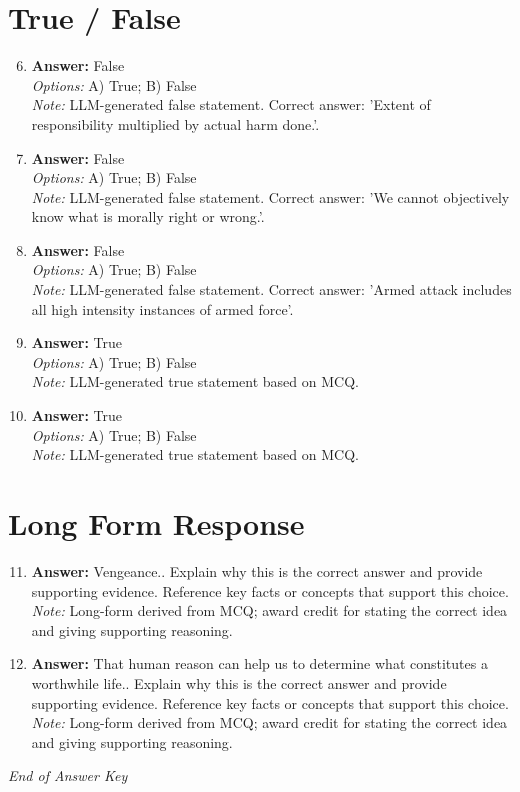 \documentclass[12pt]{article}
\begin{document}
\section*{True / False}
\begin{enumerate}[label=\arabic*.]
\setcounter{enumi}{5}
\item \textbf{Answer:} False
\\ \textit{Options:} A) True; B) False
\\ \textit{Note:} LLM-generated false statement. Correct answer: 'Extent of responsibility multiplied by actual harm done.'.
\item \textbf{Answer:} False
\\ \textit{Options:} A) True; B) False
\\ \textit{Note:} LLM-generated false statement. Correct answer: 'We cannot objectively know what is morally right or wrong.'.
\item \textbf{Answer:} False
\\ \textit{Options:} A) True; B) False
\\ \textit{Note:} LLM-generated false statement. Correct answer: 'Armed attack includes all high intensity instances of armed force'.
\item \textbf{Answer:} True
\\ \textit{Options:} A) True; B) False
\\ \textit{Note:} LLM-generated true statement based on MCQ.
\item \textbf{Answer:} True
\\ \textit{Options:} A) True; B) False
\\ \textit{Note:} LLM-generated true statement based on MCQ.
\end{enumerate}

\section*{Long Form Response}
\begin{enumerate}[label=\arabic*.]
\setcounter{enumi}{10}
\item \textbf{Answer:} Vengeance.. Explain why this is the correct answer and provide supporting evidence. Reference key facts or concepts that support this choice.
\\ \textit{Note:} Long-form derived from MCQ; award credit for stating the correct idea and giving supporting reasoning.
\item \textbf{Answer:} That human reason can help us to determine what constitutes a worthwhile life.. Explain why this is the correct answer and provide supporting evidence. Reference key facts or concepts that support this choice.
\\ \textit{Note:} Long-form derived from MCQ; award credit for stating the correct idea and giving supporting reasoning.
\end{enumerate}

\vfill
\noindent\textit{End of Answer Key}
\end{document}
